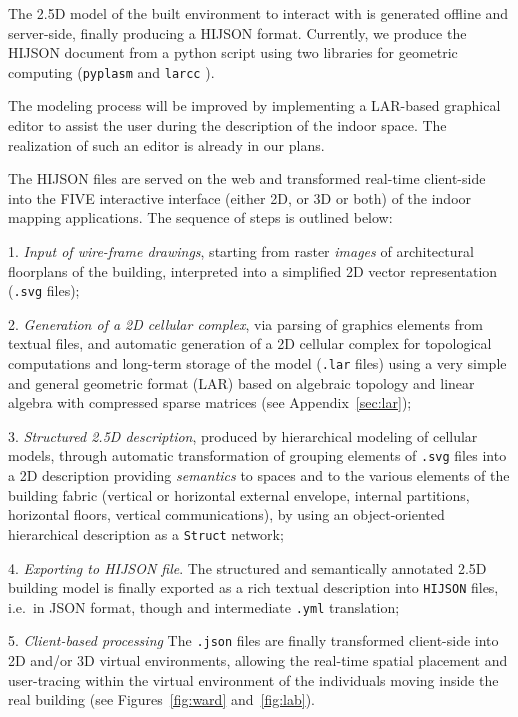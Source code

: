 The 2.5D model of the built environment to interact with is generated offline and server-side, finally producing a HIJSON format.
Currently, we produce the HIJSON document from a python
script using two libraries for geometric computing (\texttt{pyplasm} and \texttt{larcc} \cite{Dicarlo:2014:TNL:2543138.2543294,paoluzziMS:2014,cadanda:2015}).


The modeling process will be improved by implementing a LAR-based 
graphical editor to assist the user during the description of the indoor
space. The realization of such an editor is already in our plans.



 The HIJSON  files are served on the web and transformed real-time client-side into the FIVE interactive interface (either 2D, or 3D or both) of the indoor mapping applications. The sequence of steps is outlined below:

1. \textit{Input of wire-frame drawings},
  starting from   raster \emph{images} of architectural floorplans of the building, interpreted into a simplified 2D vector representation (\texttt{.svg} files);

2. \textit{Generation of a 2D cellular complex}, via
  parsing of graphics elements from textual files, and automatic generation of a 2D cellular complex for topological computations and long-term storage of the model (\texttt{.lar} files) using a very simple and general geometric format (LAR) based on algebraic topology and linear algebra with compressed sparse matrices (see Appendix~\ref{sec:lar});

3. \textit{Structured 2.5D description}, produced by
  hierarchical modeling of cellular models, through automatic transformation of grouping elements of \texttt{.svg} files into a 2D description providing \emph{semantics} to spaces and  to the various elements of the building fabric (vertical or horizontal external envelope, internal partitions, horizontal floors, vertical communications), by using an object-oriented hierarchical description as a  \texttt{Struct} network;

4. \textit{Exporting to HIJSON file}.
The  structured and semantically annotated 2.5D building model is finally  exported as a rich textual description into \texttt{HIJSON} files, i.e.~in JSON format, though and intermediate \texttt{.yml} translation;

5. \textit{Client-based processing}
  The \texttt{.json} files are finally transformed client-side into 
  2D and/or 3D virtual environments, allowing the real-time spatial placement and
  user-tracing within the virtual environment of the individuals moving
  inside the real building (see Figures~\ref{fig:ward} and~\ref{fig:lab}).

